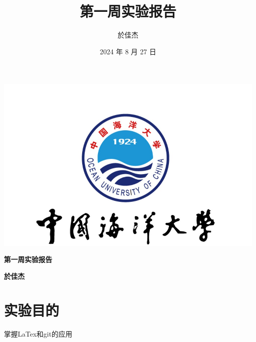 \documentclass[UTF8]{ctexart}
\begin{document}
\begin{center}
    \includegraphics[width=\textwidth]{o} %
\end{center}

\begin{center}
    \huge\textbf{第一周实验报告}
\end{center}

\begin{center}
    \huge\textbf{於佳杰}
\end{center}
\newpage
\title{第一周实验报告}
\author{於佳杰}
\date{2024 年 8 月 27 日}
\maketitle
{}
\tableofcontents
\newpage



\pagestyle{fancy}
\fancyhf{}
\renewcommand{\headrulewidth}{1pt}
\renewcommand{\footrulewidth}{1pt}
\fancyhead[C]{\rightmark}
\fancyfoot[C]{\thepage}
\fancyhead[R]{\thepage}








\section{实验目的}
{\color{red}掌握LaTex和git的应用}
\end{document}
